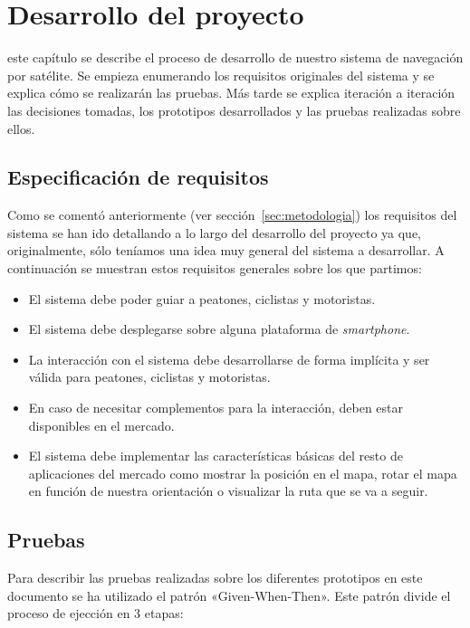 \chapter{Desarrollo del proyecto}
\label{chap:desarrollo}

 este capítulo se describe el proceso de desarrollo de nuestro sistema de navegación por
satélite. Se empieza enumerando los requisitos originales del sistema y se explica cómo se
realizarán las pruebas. Más tarde se explica iteración a iteración las decisiones tomadas, los
prototipos desarrollados y las pruebas realizadas sobre ellos.

\section{Especificación de requisitos}

Como se comentó anteriormente (ver sección~\ref{sec:metodologia}) los requisitos del sistema se
han ido detallando a lo largo del desarrollo del proyecto ya que, originalmente, sólo teníamos una
idea muy general del sistema a desarrollar. A continuación se muestran estos requisitos generales
sobre los que partimos:

\begin{itemize}
  \item El sistema debe poder guiar a peatones, ciclistas y motoristas.
  \item El sistema debe desplegarse sobre alguna plataforma de \emph{smartphone}.
  \item La interacción con el sistema debe desarrollarse de forma implícita y ser válida para
    peatones, ciclistas y motoristas.
  \item En caso de necesitar complementos para la interacción, deben estar disponibles en el
    mercado.
  \item El sistema debe implementar las características básicas del resto de aplicaciones del
    mercado como mostrar la posición en el mapa, rotar el mapa en función de nuestra orientación o
    visualizar la ruta que se va a seguir.
\end{itemize}

\section{Pruebas}

Para describir las pruebas realizadas sobre los diferentes prototipos en este documento se ha
utilizado el patrón «Given-When-Then». Este patrón divide el proceso de ejección en 3 etapas:


